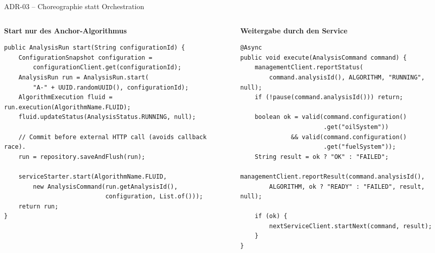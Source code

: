\begin{frame}[fragile]{ADR-03 -- Choreographie statt Orchestration}
  \begin{columns}[T,onlytextwidth]
    \begin{column}{0.54\textwidth}
      \textbf{Start nur des Anchor-Algorithmus}
      \begin{lstlisting}[style=java]
public AnalysisRun start(String configurationId) {
    ConfigurationSnapshot configuration =
        configurationClient.get(configurationId);
    AnalysisRun run = AnalysisRun.start(
        "A-" + UUID.randomUUID(), configurationId);
    AlgorithmExecution fluid = run.execution(AlgorithmName.FLUID);
    fluid.updateStatus(AnalysisStatus.RUNNING, null);

    // Commit before external HTTP call (avoids callback race).
    run = repository.saveAndFlush(run);

    serviceStarter.start(AlgorithmName.FLUID,
        new AnalysisCommand(run.getAnalysisId(),
                            configuration, List.of()));
    return run;
}
      \end{lstlisting}
    \end{column}
    \begin{column}{0.42\textwidth}
      \textbf{Weitergabe durch den Service}
      \begin{lstlisting}[style=java]
@Async
public void execute(AnalysisCommand command) {
    managementClient.reportStatus(
        command.analysisId(), ALGORITHM, "RUNNING", null);
    if (!pause(command.analysisId())) return;

    boolean ok = valid(command.configuration()
                       .get("oilSystem"))
              && valid(command.configuration()
                       .get("fuelSystem"));
    String result = ok ? "OK" : "FAILED";
    managementClient.reportResult(command.analysisId(),
        ALGORITHM, ok ? "READY" : "FAILED", result, null);

    if (ok) {
        nextServiceClient.startNext(command, result);
    }
}
      \end{lstlisting}
    \end{column}
  \end{columns}
\end{frame}

